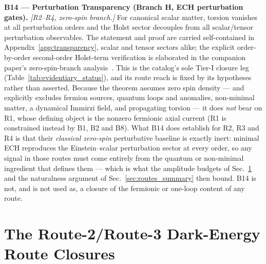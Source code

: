 \documentclass[aps,prd,twocolumn,superscriptaddress,showpacs,preprintnumbers,nofootinbib,longbibliography,floatfix]{revtex4-2}
\begin{document}
\medskip\noindent\textbf{B14 --- Perturbation Transparency (Branch H, ECH perturbation gates).} \emph{[R2--R4, zero-spin branch.]} For
canonical scalar matter, torsion vanishes at all perturbation orders and the Holst sector
decouples from all scalar/tensor perturbation observables. The statement
and proof are carried self-contained in
Appendix~\ref{app:transparency}, scalar and tensor sectors alike; the
explicit order-by-order second-order Holst-term verification is
elaborated in the
companion paper's zero-spin-branch analysis~\cite{Golden2026P1a}. This is
the catalog's sole Tier-I closure leg
(Table~\ref{tab:evidentiary_status}), and its route reach is fixed by its
hypotheses rather than asserted. Because the theorem assumes zero spin
density --- and explicitly excludes fermion sources, quantum loops and
anomalies, non-minimal matter, a dynamical Immirzi field, and propagating
torsion --- it does \emph{not} bear on R1, whose defining object is the
nonzero fermionic axial current (R1 is constrained instead by B1, B2 and
B8). What B14 does establish for R2, R3 and R4 is that their
\emph{classical zero-spin} perturbative baseline is exactly inert: minimal
ECH reproduces the Einstein--scalar perturbation sector at every order, so
any signal in those routes must come entirely from the quantum or
non-minimal ingredient that defines them --- which is what the amplitude
budgets of Sec.~\ref{sec:routes} and the naturalness argument of
Sec.~\ref{sec:routes_summary} then bound. B14 is not, and is not used as,
a closure of the fermionic or one-loop content of any route.


\section{The Route-2/Route-3 Dark-Energy Route Closures}\label{sec:routes}
\end{document}
